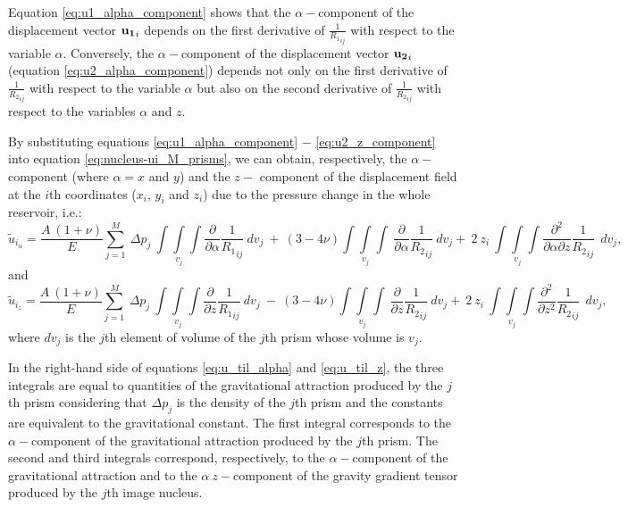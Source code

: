 \documentclass[journal abbreviation, manuscript]{copernicus}
\begin{document}
Equation \ref{eq:u1_alpha_component} shows that the $\alpha-$component of the displacement vector ${\bf{u_{1}}}_{i}$  depends on the first derivative of ${\frac{1}{{R_1}_{ij}}}$  
with respect to the variable $\alpha$.
Conversely, the $\alpha-$component of the displacement vector ${\bf{u_{2}}}_{i}$  
(equation \ref{eq:u2_alpha_component}) depends not only on the first derivative of 
${\frac{1}{{R_2}_{ij}}}$  with respect to the variable $\alpha$ but also on the second derivative of ${\frac{1}{{R_2}_{ij}}}$  with respect to the variables $\alpha$ and $z$.

By substituting equations \ref{eq:u1_alpha_component} $-$ \ref{eq:u2_z_component} into equation \ref{eq:nucleus-ui_M_prisms}, we can obtain, respectively,  the $\alpha-$component (where  $\alpha = x$ and $y$) and the $z-$ component of the displacement field at the $i$th coordinates ($x_i$, $y_i$  and $z_i$) due to the pressure change in the whole reservoir, i.e.:
\begin{equation}
{\tilde{u}}_{{i}_\alpha} = \frac{A  \: (1 + \nu)}{E}  \sum_{j=1}^{M} 
\: \Delta p_{j}  \: \int\int\limits_{v_j}\int 
\frac{\partial }{\partial \alpha} {\frac{1}{{R_1}_{ij}}} \:  dv_j 
\: + \: 
(3  - 4 \nu)  \int\int\limits_{v_j}\int
\: \frac{\partial }{\partial \alpha} {\frac{1}{{R_2}_{ij}}}\:  dv_j
+ \: 2 \: z_{i} \:  \int\int\limits_{v_j}\int
\frac{\partial^{2}  }{\partial \alpha \partial z} {\frac{1}{{R_2}_{ij}}}  \:\:  dv_j, 
\label{eq:u_til_alpha}
\end{equation}
and 
\begin{equation}
{\tilde{u}}_{{i}_z} = \frac{A  \: (1 + \nu)}{E}  \sum_{j=1}^{M} 
\: \Delta p_{j}  \: \int\int\limits_{v_j}\int 
\frac{\partial }{\partial z} {\frac{1}{{R_1}_{ij}}} \:  dv_j 
\: - \: (3  - 4 \nu)  \int\int\limits_{v_j}\int
\: \frac{\partial }{\partial z} {\frac{1}{{R_2}_{ij}}}\:  dv_j
+ \: 2 \: z_{i} \:  \int\int\limits_{v_j}\int
\frac{\partial^{2}  }{\partial z^{2}} {\frac{1}{{R_2}_{ij}}}  \:\:  dv_j, 
\label{eq:u_til_z}
\end{equation}
where $dv_j$ is the $j$th element of volume of the $j$th prism whose volume is $v_j$.


In the right-hand side of equations \ref{eq:u_til_alpha} and \ref{eq:u_til_z}, the three integrals are equal to  quantities of the gravitational attraction produced by the $j$th prism considering that 
$\Delta p_{j}$ is the density of the $j$th prism and the constants are equivalent to the gravitational constant. 
The first integral corresponds to the $\alpha-$component of the gravitational attraction produced by the $j$th prism.
The second and third integrals correspond, respectively, to the $\alpha-$component of the gravitational attraction and to the $\alpha \:z-$component of the gravity gradient tensor produced by the $j$th image nucleus. 
\end{document}
